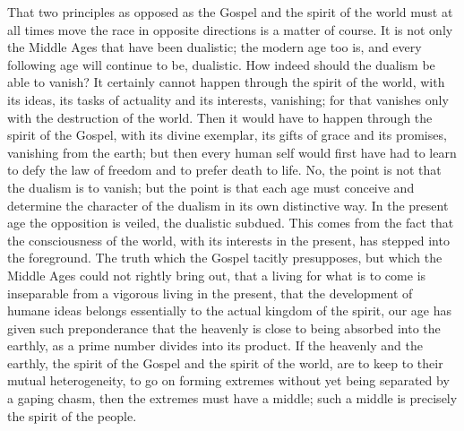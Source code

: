 \documentclass[12pt]{book}
\newcommand{\opage}[1]{\marginnote{\footnotesize\textit{[#1]}}}
\begin{document}
That two principles as opposed as the Gospel and the spirit of the world
must at all times move the race in opposite directions is a matter of
course. It is not only the Middle Ages that have been dualistic; the
modern age too is, and every following age will continue to be,
dualistic. How indeed should the dualism
be able to vanish? It certainly cannot happen through the spirit of the
world, with its ideas, its tasks of actuality and its interests,
vanishing; for that vanishes only with the destruction of the world.
Then it would have to happen through the spirit of the Gospel, with its
divine exemplar, its gifts of grace and its promises, vanishing from the
earth; but then every human self would first have had to learn to defy
the law of freedom and to prefer death to life. No, the point is not
that the dualism is to vanish; but the point is that each age must
conceive and determine the character of the dualism in its own
distinctive way. In the present age the opposition is veiled, the
dualistic subdued. This comes from the fact that the consciousness of
the world, with its interests in the present, has stepped into the
foreground. The truth which the Gospel tacitly presupposes, but which
the Middle Ages could not rightly bring out, that a living for what is
to come is inseparable from a vigorous living in the present, that the
development
\opage{47}\setcounter{footnote}{0}%
of humane ideas belongs essentially to the actual kingdom of the spirit,
our age has given such preponderance that the heavenly is close to
being absorbed into the earthly, as a prime number divides into its
product. If the heavenly and the earthly, the spirit of the Gospel and
the spirit of the world, are to keep to their mutual heterogeneity, to
go on forming extremes without yet being separated by a gaping chasm,
then the extremes must have a middle; such a middle is precisely the
spirit of the people.
\end{document}
